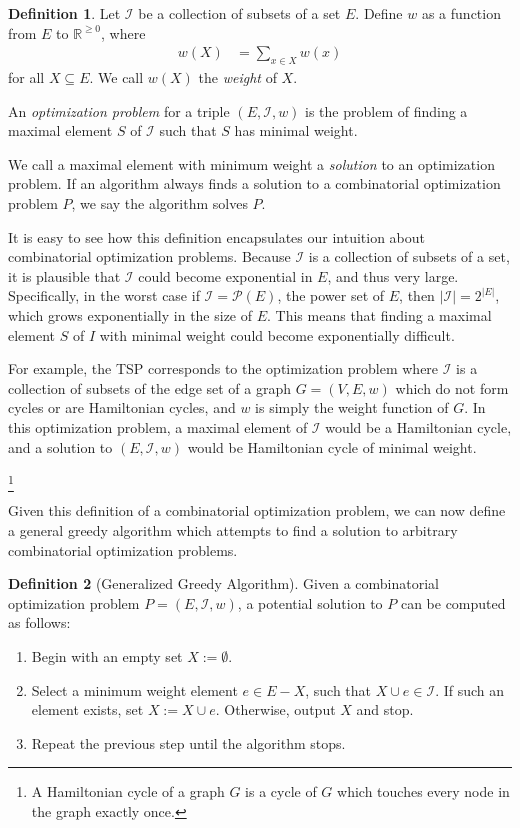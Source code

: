 \documentclass[a4paper,11pt]{report}
\theoremstyle{plain}
\theoremstyle{definition}
\newtheorem{defn}[defn]{Definition}
\newcommand{\I}{\mathcal{I}}
\begin{document}
\begin{defn}
Let $\I$ be a collection of subsets of a set $E$. Define $w$ as a function from
$E$ to $\mathbb{R}^{\geq 0}$, where
\begin{align*}
w(X) &= \sum_{x \in X}{w(x)}
\end{align*}
for all $X \subseteq E$. We call $w(X)$ the \emph{weight} of $X$.

An \emph{optimization problem} for a triple $(E,\I,w)$ is the problem of finding a
maximal element $S$ of $\I$ such that $S$ has minimal weight.
\end{defn}

We call a maximal element with minimum weight a \emph{solution} to an
optimization problem. If an algorithm always finds a solution to a
combinatorial optimization problem $P$, we say the algorithm solves $P$.

It is easy to see how this definition encapsulates our intuition about
combinatorial optimization problems. Because $\I$ is a collection of subsets of
a set, it is plausible that $\I$ could become exponential in $E$, and thus very
large. Specifically, in the worst case if $\I = \mathcal{P}(E)$, the power set
of $E$, then $|\I| = 2^{|E|}$, which grows exponentially in the size of $E$.
This means that finding a maximal element $S$ of $I$ with minimal weight could
become exponentially difficult.

For example, the TSP corresponds to the optimization problem where $\I$ is a
collection of subsets of the edge set of a graph $G = (V,E,w)$ which do not
form cycles or are Hamiltonian cycles\footnotemark, and $w$ is simply the
weight function of $G$. In this optimization problem, a maximal element of $\I$
would be a Hamiltonian cycle, and a solution to $(E,\I,w)$ would be Hamiltonian
cycle of minimal weight.

\footnote{A Hamiltonian cycle of a graph $G$ is a cycle of $G$ which touches
every node in the graph exactly once.}

Given this definition of a combinatorial optimization problem, we can now
define a general greedy algorithm which attempts to find a solution to
arbitrary combinatorial optimization problems.

\begin{defn}[Generalized Greedy Algorithm]
Given a combinatorial optimization problem $P = (E,\I,w)$, a potential solution
to $P$ can be computed as follows:

\begin{enumerate}
    \item Begin with an empty set $X := \emptyset$.
    \item Select a minimum weight element $e \in E - X$, such that $X \cup e
          \in \I$. If such an element exists, set $X := X \cup e$. Otherwise,
          output $X$ and stop.
    \item Repeat the previous step until the algorithm stops.
\end{enumerate}
\end{defn}
\end{document}
